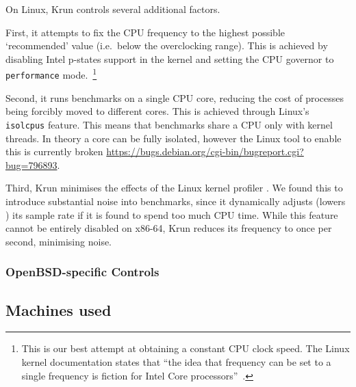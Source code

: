 \documentclass[10pt,preprint]{sigplanconf}
\newcommand{\krun}{Krun\xspace}
\begin{document}
On Linux, \krun controls several additional factors.

First, it attempts to fix the CPU frequency to the highest
possible `recommended' value (i.e.~below the overclocking range). This is achieved by disabling Intel
p-states support in the kernel and setting the CPU governor to \texttt{performance}
mode.~\footnote{This is our best attempt at obtaining a constant CPU clock
speed. The Linux kernel documentation states that ``the idea that frequency can
be set to a single frequency is fiction for Intel Core
processors''~\cite{XXX}.}

Second, it runs benchmarks on a single CPU core, reducing the cost of processes
being forcibly moved to different cores. This is achieved through Linux's
\texttt{isolcpus} feature.  This means that benchmarks
share a CPU only with kernel threads. In theory a core can be fully isolated,
however the Linux tool to enable this is currently broken
\url{https://bugs.debian.org/cgi-bin/bugreport.cgi?bug=796893}.

Third, \krun minimises the effects of the Linux kernel profiler . We found this to introduce
substantial noise into benchmarks, since it dynamically adjusts (lowers
) its sample rate if it is found
to spend too much CPU time. While this feature cannot be entirely disabled on
x86-64, \krun reduces its frequency to once per second, minimising noise.


\subsubsection{OpenBSD-specific Controls}


\subsection{Machines used}
\end{document}
